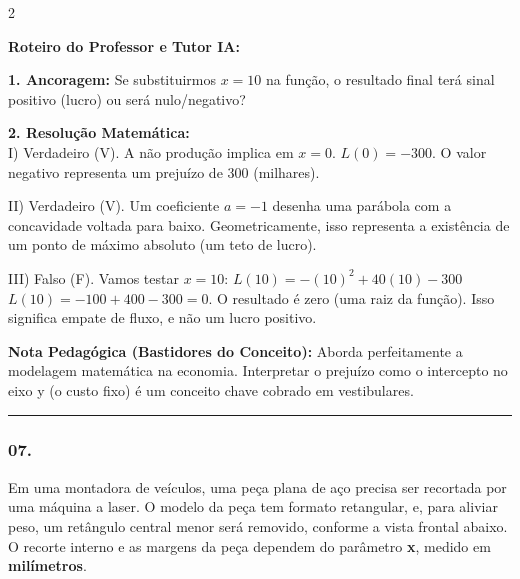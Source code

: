 \begin{multicols*}{2}
\ifgabarito
    \begin{tcolorbox}[colback=CorTitUm!5, colframe=CorTitUm, boxrule=1pt, arc=4pt, left=6pt, right=6pt, top=6pt, bottom=6pt]
    \small\textbf{\textcolor{CorTitUm}{Roteiro do Professor e Tutor IA:}}\par\vspace{0.1cm}
    \color{CinzaEscuro}
    \textbf{1. Ancoragem:} Se substituirmos $x=10$ na função, o resultado final terá sinal positivo (lucro) ou será nulo/negativo?\par\vspace{0.1cm}
    \textbf{2. Resolução Matemática:}\\
    I) Verdadeiro (V). A não produção implica em $x = 0$.
    $L(0) = -300$. O valor negativo representa um prejuízo de 300 (milhares).
    
    II) Verdadeiro (V). Um coeficiente $a = -1$ desenha uma parábola com a concavidade voltada para baixo. Geometricamente, isso representa a existência de um ponto de máximo absoluto (um teto de lucro).
    
    III) Falso (F). Vamos testar $x = 10$:
    $L(10) = -(10)^2 + 40(10) - 300$
    $L(10) = -100 + 400 - 300 = 0$.
    O resultado é zero (uma raiz da função). Isso significa empate de fluxo, e não um lucro positivo.
    \end{tcolorbox}
    \vspace{0.15cm}
    
    \begin{boxexplicacao}
    \textbf{Nota Pedagógica (Bastidores do Conceito):} Aborda perfeitamente a modelagem matemática na economia. Interpretar o prejuízo como o intercepto no eixo y (o custo fixo) é um conceito chave cobrado em vestibulares.
    \end{boxexplicacao}
\fi

\par\vspace{\espacoQuestao}

\noindent\textcolor{CorLinha}{\rule{\linewidth}{0.5pt}} 
\par\vspace{\espacoPreQuestao}
\subsubsection*{07.} 
\begin{enunciadoLiteral}
Em uma montadora de veículos, uma peça plana de aço precisa ser recortada por uma máquina a laser. O modelo da peça tem formato retangular, e, para aliviar peso, um retângulo central menor será removido, conforme a vista frontal abaixo. O recorte interno e as margens da peça dependem do parâmetro \textbf{x}, medido em \textbf{milímetros}.


\end{enunciadoLiteral}
\end{multicols*}
